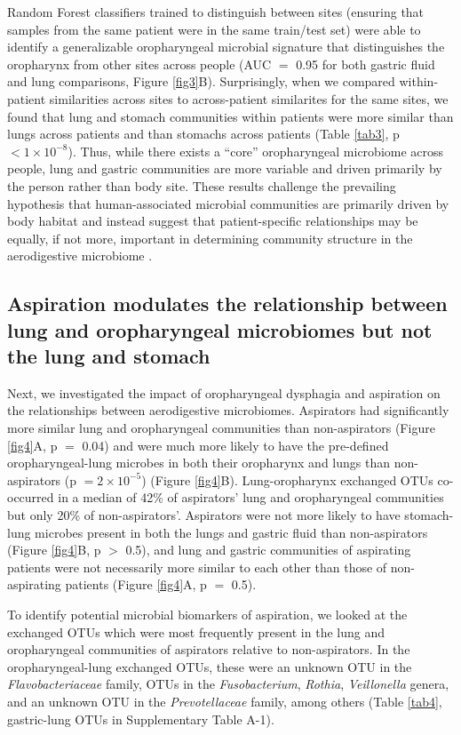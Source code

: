 Random Forest classifiers trained to distinguish between sites (ensuring that samples from the same patient were in the same train/test set) were able to identify a generalizable oropharyngeal microbial signature that distinguishes the oropharynx from other sites across people (AUC $=$ 0.95 for both gastric fluid and lung comparisons, Figure \ref{fig3}B).
Surprisingly, when we compared within-patient similarities across sites to across-patient similarites for the same sites, we found that lung and stomach communities within patients were more similar than lungs across patients and than stomachs across patients (Table \ref{tab3}, p $< 1 \times 10^{-8}$).
Thus, while there exists a ``core'' oropharyngeal microbiome across people, lung and gastric communities are more variable and driven primarily by the person rather than body site.
These results challenge the prevailing hypothesis that human-associated microbial communities are primarily driven by body habitat and instead suggest that patient-specific relationships may be equally, if not more, important in determining community structure in the aerodigestive microbiome \cite{costello2009bodysites,huttenhower2012hmp,lozupone2013bodysites}.

\FloatBarrier

\subsection{Aspiration modulates the relationship between lung and oropharyngeal microbiomes but not the lung and stomach}

Next, we investigated the impact of oropharyngeal dysphagia and aspiration on the relationships between aerodigestive microbiomes.
Aspirators had significantly more similar lung and oropharyngeal communities than non-aspirators (Figure \ref{fig4}A, p $=$ 0.04) and were much more likely to have the pre-defined oropharyngeal-lung microbes in both their oropharynx and lungs than non-aspirators (p $= 2 \times 10^{-5}$) (Figure \ref{fig4}B).
Lung-oropharynx exchanged OTUs co-occurred in a median of 42\% of aspirators' lung and oropharyngeal communities but only 20\% of non-aspirators'.
Aspirators were not more likely to have stomach-lung microbes present in both the lungs and gastric fluid than non-aspirators (Figure \ref{fig4}B, p $>$ 0.5), and lung and gastric communities of aspirating patients were not necessarily more similar to each other than those of non-aspirating patients (Figure \ref{fig4}A, p $=$ 0.5).

To identify potential microbial biomarkers of aspiration, we looked at the exchanged OTUs which were most frequently present in the lung and oropharyngeal communities of aspirators relative to non-aspirators.
In the oropharyngeal-lung exchanged OTUs, these were an unknown OTU in the \textit{Flavobacteriaceae} family, OTUs in the \textit{Fusobacterium}, \textit{Rothia}, \textit{Veillonella} genera, and an unknown OTU in the \textit{Prevotellaceae} family, among others (Table \ref{tab4}, gastric-lung OTUs in Supplementary Table A-1).

